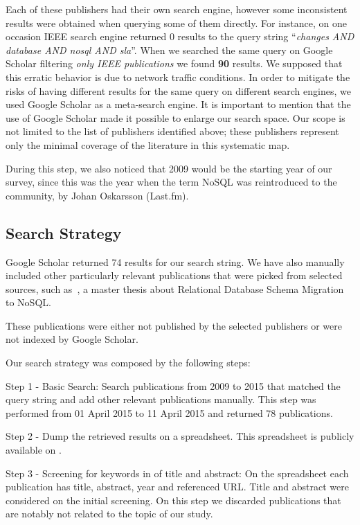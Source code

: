 \documentclass[]{tEIS2e}
\theoremstyle{plain}
\theoremstyle{remark}
\begin{document}
Each of these publishers had their own search engine, however some inconsistent results were obtained when querying some of them directly.
For instance, on one occasion IEEE search engine returned 0 results to the query string ``\textit{changes AND database AND nosql AND sla}''. 
When we searched the same query on Google Scholar filtering \textit{only IEEE publications} we found \textbf{90} results.
We supposed that this erratic behavior is due to network traffic conditions.
In order to mitigate the risks of having different results for the same query on different search engines, we used Google Scholar as a meta-search engine. 
It is important to mention that the use of Google Scholar made it possible to enlarge our search space.
Our scope is not limited to the list of publishers identified above; these publishers represent only the minimal coverage of the literature in this systematic map.

During this step, we also noticed that 2009 would be the starting year of our survey, since this was the year when the term NoSQL was reintroduced to the community, by Johan Oskarsson (Last.fm)\citep{ericevans}.

\subsection{Search Strategy}\label{sec:searchStrategy}

Google Scholar returned 74 results for our search string. We have also manually included other particularly relevant publications that were picked from selected sources, such as~\citep{mastersthesrilinda}, a master thesis about Relational Database Schema Migration to NoSQL.

These publications were either not published by the selected publishers or were not indexed by Google Scholar. 

Our search strategy was composed by the following steps:

Step 1 - Basic Search: Search publications from 2009 to 2015 that matched the query string and add other relevant publications manually. This step was performed from 01 April 2015 to 11 April 2015 and returned 78 publications.

Step 2 - Dump the retrieved results on a spreadsheet. This spreadsheet is publicly available on \citep{systematicMappingSpreadsheet}.

Step 3 - Screening for keywords in of title and abstract: On the spreadsheet each publication has title, abstract, year and referenced URL. Title and abstract were considered on the initial screening. On this step we discarded publications that are notably not related to the topic of our study. %
\end{document}
